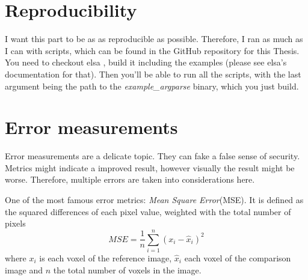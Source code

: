\section{Reproducibility}\label{sec:experiments_repoduction}

I want this part to be as as reproducible as possible. Therefore, I ran as much as I can with
scripts, which can be found in the GitHub repository for this Thesis. You need to checkout elsa
, build it including the examples (please see elsa's documentation for that).
Then you'll be able to run all the scripts, with the last argument being the path to the
\textit{example\_argparse} binary, which you just build.

\section{Error measurements}\label{sec:error_measurements}

Error measurements are a delicate topic. They can fake a false sense of security. Metrics might
indicate a improved result, however visually the result might be worse. Therefore, multiple errors
are taken into considerations here.

\begin{definition}
	One of the most famous error metrics: \textit{Mean Square Error}(MSE). It is defined as the
	squared differences of each pixel value, weighted with the total number of pixels
	\[ MSE = \frac{1}{n} \sum_{i=1}^{n}(x_i - \hat{x}_i)^2\]
	where \(x_i\) is each voxel of the reference image, \(\hat{x}_i\) each voxel of the comparison
	image and \(n\) the total number of voxels in the image.
\end{definition}

